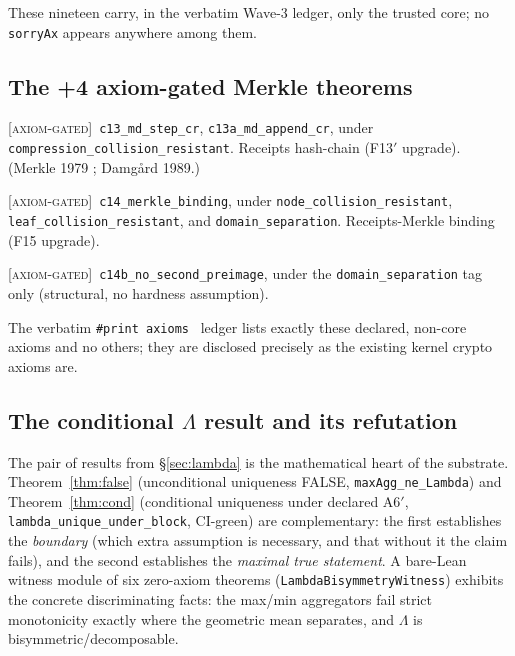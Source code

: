 \documentclass[11pt]{article}
\theoremstyle{plain}
\theoremstyle{definition}
\theoremstyle{remark}
\newcommand{\statusAxiom}{\textcolor{orange!80!black}{\textsc{[axiom-gated]}}}
\newcommand{\La}{\Lambda}
\newcommand{\printax}[1]{\texttt{\#print axioms}~\texttt{#1}}
\begin{document}
These nineteen carry, in the verbatim Wave-3 ledger, only the trusted core; no
\texttt{sorryAx} appears anywhere among them.

\subsection{The +4 axiom-gated Merkle theorems}
\begin{description}[leftmargin=1.6em,itemsep=3pt]
  \item[C13 --- Merkle--Damg{\aa}rd collision-resistance preservation] \statusAxiom\
    \texttt{c13\_md\_step\_cr}, \texttt{c13a\_md\_append\_cr}, under
    \texttt{compression\_collision\_resistant}. Receipts hash-chain (F13$'$ upgrade).
    (Merkle 1979 \cite{merkle1979}; Damg{\aa}rd 1989.)
  \item[C14 --- Merkle-tree binding] \statusAxiom\
    \texttt{c14\_merkle\_binding}, under \texttt{node\_collision\_resistant},
    \texttt{leaf\_collision\_resistant}, and \texttt{domain\_separation}.
    Receipts-Merkle binding (F15 upgrade).
  \item[C14b --- Domain separation blocks second-preimage] \statusAxiom\
    \texttt{c14b\_no\_second\_preimage}, under the \texttt{domain\_separation} tag
    only (structural, no hardness assumption).
\end{description}
The verbatim \printax{} ledger lists exactly these declared, non-core axioms and no
others; they are disclosed precisely as the existing kernel crypto axioms are.

\subsection{The conditional $\La$ result and its refutation}
The pair of results from \S\ref{sec:lambda} is the mathematical heart of the
substrate. Theorem~\ref{thm:false} (unconditional uniqueness FALSE,
\texttt{maxAgg\_ne\_Lambda}) and Theorem~\ref{thm:cond} (conditional uniqueness
under declared A6$'$, \texttt{lambda\_unique\_under\_block}, CI-green) are
complementary: the first establishes the \emph{boundary} (which extra assumption is
necessary, and that without it the claim fails), and the second establishes the
\emph{maximal true statement}. A bare-Lean witness module of six zero-axiom theorems
(\texttt{LambdaBisymmetryWitness}) exhibits the concrete discriminating facts: the
max/min aggregators fail strict monotonicity exactly where the geometric mean
separates, and $\La$ is bisymmetric/decomposable.
\end{document}
